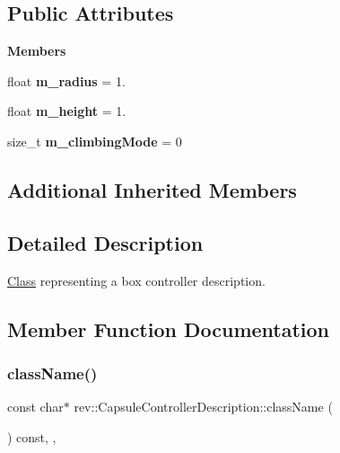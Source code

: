 \subsection*{Public Attributes}
\begin{Indent}\textbf{ Members}\par
\begin{DoxyCompactItemize}
\item 
\mbox{\label{classrev_1_1_capsule_controller_description_a2cd9ee97e1833650c568279677283fa7}} 
float {\bfseries m\+\_\+radius} = 1.
\item 
\mbox{\label{classrev_1_1_capsule_controller_description_a1d1fb877091c2216c18871fe2316cf30}} 
float {\bfseries m\+\_\+height} = 1.
\item 
\mbox{\label{classrev_1_1_capsule_controller_description_a5a82ebf2ac2e667529610133a053edab}} 
size\+\_\+t {\bfseries m\+\_\+climbing\+Mode} = 0
\end{DoxyCompactItemize}
\end{Indent}
\subsection*{Additional Inherited Members}


\subsection{Detailed Description}
\mbox{\hyperlink{struct_class}{Class}} representing a box controller description. 

\subsection{Member Function Documentation}
\mbox{\label{classrev_1_1_capsule_controller_description_aca7d4aff153f3db30084d730966ceb05}} 
\subsubsection{\texorpdfstring{className()}{className()}}
{\footnotesize\ttfamily const char$\ast$ rev\+::\+Capsule\+Controller\+Description\+::class\+Name (\begin{DoxyParamCaption}{ }\end{DoxyParamCaption}) const\hspace{0.3cm}{\ttfamily [inline]}, {\ttfamily [override]}, {\ttfamily [virtual]}}



